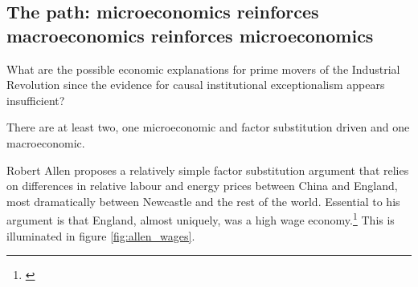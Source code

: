 \documentclass[12pt]{article}
\numberwithin{equation}{section}
\begin{document}
		

			
		\subsection{The path: microeconomics reinforces macroeconomics reinforces microeconomics}
		
		What are the possible economic explanations for prime movers of the Industrial Revolution since the evidence for causal institutional exceptionalism appears insufficient?
		
		There are at least two, one microeconomic and factor substitution driven and one macroeconomic.
		
		Robert Allen proposes a relatively simple factor substitution argument that relies on differences in relative labour and energy prices between China and England, most dramatically between Newcastle and the rest of the world. Essential to his argument is that England, almost uniquely, was a high wage economy.\footnote{\citet[p.~34]{allen_british_2009}} This is illuminated in figure \ref{fig:allen_wages}. 
		
\end{document}

